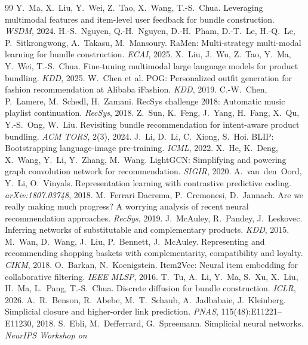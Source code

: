 \documentclass[10pt]{article}
\begin{document}






\begin{thebibliography}{99}\small
{} Y.~Ma, X.~Liu, Y.~Wei, Z.~Tao, X.~Wang, T.-S.~Chua. Leveraging multimodal features and
item-level user feedback for bundle construction. \emph{WSDM}, 2024.
 H.-S.~Nguyen, Q.-H.~Nguyen, D.-H.~Pham, D.-T.~Le, H.-Q.~Le, P.~Sitkrongwong, A.~Takasu,
M.~Mansoury. RaMen: Multi-strategy multi-modal learning for bundle construction. \emph{ECAI}, 2025.
 X.~Liu, J.~Wu, Z.~Tao, Y.~Ma, Y.~Wei, T.-S.~Chua. Fine-tuning multimodal large language
models for product bundling. \emph{KDD}, 2025.
 W.~Chen et al. POG: Personalized outfit generation for fashion recommendation at Alibaba
iFashion. \emph{KDD}, 2019.
 C.-W.~Chen, P.~Lamere, M.~Schedl, H.~Zamani. RecSys challenge 2018: Automatic music
playlist continuation. \emph{RecSys}, 2018.
 Z.~Sun, K.~Feng, J.~Yang, H.~Fang, X.~Qu, Y.-S.~Ong, W.~Liu. Revisiting bundle
recommendation for intent-aware product bundling. \emph{ACM TORS}, 2(3), 2024.
 J.~Li, D.~Li, C.~Xiong, S.~Hoi. BLIP: Bootstrapping language-image pre-training. \emph{ICML},
2022.
 X.~He, K.~Deng, X.~Wang, Y.~Li, Y.~Zhang, M.~Wang. LightGCN: Simplifying and powering
graph convolution network for recommendation. \emph{SIGIR}, 2020.
 A.~van~den~Oord, Y.~Li, O.~Vinyals. Representation learning with contrastive predictive
coding. \emph{arXiv:1807.03748}, 2018.
 M.~Ferrari Dacrema, P.~Cremonesi, D.~Jannach. Are we really making much progress? A worrying
analysis of recent neural recommendation approaches. \emph{RecSys}, 2019.
 J.~McAuley, R.~Pandey, J.~Leskovec. Inferring networks of substitutable and complementary
products. \emph{KDD}, 2015.
 M.~Wan, D.~Wang, J.~Liu, P.~Bennett, J.~McAuley. Representing and recommending shopping
baskets with complementarity, compatibility and loyalty. \emph{CIKM}, 2018.
 O.~Barkan, N.~Koenigstein. Item2Vec: Neural item embedding for collaborative filtering.
\emph{IEEE MLSP}, 2016.
 T.~Tu, A.~Li, Y.~Ma, S.~Xu, X.~Liu, H.~Ma, L.~Pang, T.-S.~Chua. Discrete diffusion for bundle
construction. \emph{ICLR}, 2026.
 A.~R.~Benson, R.~Abebe, M.~T.~Schaub, A.~Jadbabaie, J.~Kleinberg. Simplicial closure and
higher-order link prediction. \emph{PNAS}, 115(48):E11221--E11230, 2018.
 S.~Ebli, M.~Defferrard, G.~Spreemann. Simplicial neural networks. \emph{NeurIPS Workshop on
}
\end{thebibliography}
\end{document}
